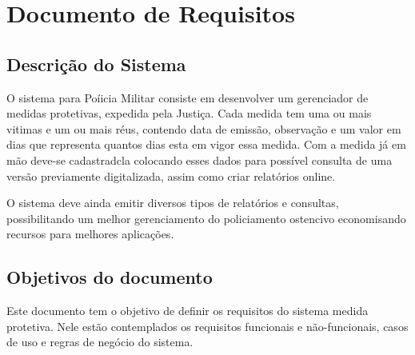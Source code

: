 \documentclass[
	12pt,				%
    oneside,			%
	a4paper,			%
	english,			%
	french,				%
	spanish,			%
	brazil,				%
	]{abntex2}
\begin{document}
\frenchspacing 


\imprimircapa

\imprimirfolhaderosto*

\tableofcontents


\textual




\chapter{Documento de Requisitos} %
	\section{Descrição do Sistema}
		O sistema para Poíicia Militar consiste em desenvolver um gerenciador de medidas protetivas, expedida pela Justiça. Cada medida tem uma ou mais vitimas e um ou mais réus, contendo data de emissão, observação e um valor em dias que representa quantos dias esta em vigor essa medida. Com a medida já em mão deve-se cadastradcla colocando esses dados para possível consulta de uma versão previamente digitalizada, assim como criar relatórios online.
	
		O sistema deve ainda emitir diversos tipos de relatórios e consultas, possibilitando um melhor gerenciamento do policiamento ostencivo economisando recursos para melhores aplicações.
		
	\section{Objetivos do documento}
	
		Este documento tem o objetivo de definir os requisitos do sistema medida protetiva. Nele estão contemplados os requisitos funcionais e não-funcionais, casos de uso e regras de negócio do sistema.
	
\end{document}
